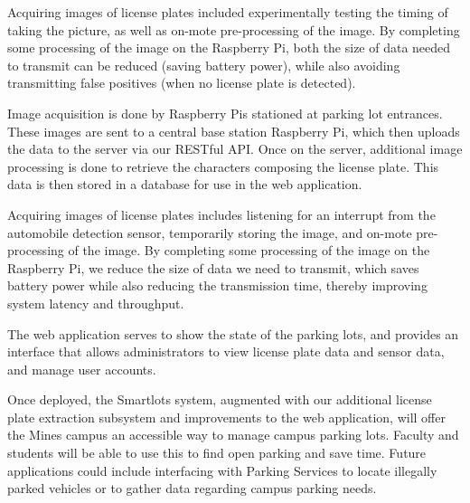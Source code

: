 \documentclass[11pt, oneside, fullpage, doublespace]{article}
\begin{document}
Acquiring images of license plates included experimentally testing the timing of taking the picture, as well as on-mote pre-processing of the image. By completing some processing of the image on the Raspberry Pi, both the size of data needed to transmit can be reduced (saving battery power), while also avoiding transmitting false positives (when no license plate is detected).

Image acquisition is done by Raspberry Pis stationed at parking lot entrances. These images are sent to a central base station Raspberry Pi, which then uploads the data to the server via our RESTful API. Once on the server, additional image processing is done to retrieve the characters composing the license plate. This data is then stored in a database for use in the web application.

Acquiring images of license plates includes listening for an interrupt from the automobile detection sensor, temporarily storing the image, and on-mote pre-processing of the image. By completing some processing of the image on the Raspberry Pi, we reduce the size of data we need to transmit, which saves battery power while also reducing the transmission time, thereby improving system latency and throughput.

The web application serves to show the state of the parking lots, and provides an interface that allows administrators to view license plate data and sensor data, and manage user accounts.

Once deployed, the Smartlots system, augmented with our additional license plate extraction subsystem and improvements to the web application, will offer the Mines campus an accessible way to manage campus parking lots. Faculty and students will be able to use this to find open parking and save time. Future applications could include interfacing with Parking Services to locate illegally parked vehicles or to gather data regarding campus parking needs.
\end{document}
